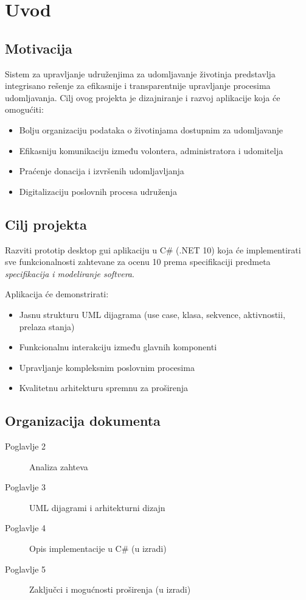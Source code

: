 \chapter{Uvod}

\section{Motivacija}

Sistem za upravljanje udruženjima za udomljavanje životinja predstavlja integrisano rešenje za efikasnije i transparentnije upravljanje procesima udomljavanja. Cilj ovog projekta je dizajniranje i razvoj aplikacije koja će omogućiti:

\begin{itemize}
    \item Bolju organizaciju podataka o životinjama dostupnim za udomljavanje
    \item Efikasniju komunikaciju između volontera, administratora i udomitelja
    \item Praćenje donacija i izvršenih udomljavljanja
    \item Digitalizaciju poslovnih procesa udruženja
\end{itemize}

\section{Cilj projekta}

Razviti prototip desktop gui aplikaciju u C\# (.NET 10) koja će implementirati sve funkcionalnosti zahtevane za ocenu 10 prema specifikaciji predmeta \textit{specifikacija i modeliranje softvera}.

Aplikacija će demonstrirati:
\begin{itemize}
    \item Jasnu strukturu UML dijagrama (use case, klasa, sekvence, aktivnostii, prelaza stanja)
    \item Funkcionalnu interakciju između glavnih komponenti
    \item Upravljanje kompleksnim poslovnim procesima
    \item Kvalitetnu arhitekturu spremnu za proširenja
\end{itemize}


\section{Organizacija dokumenta}

\begin{description}
    \item[Poglavlje 2] Analiza zahteva
    \item[Poglavlje 3] UML dijagrami i arhitekturni dizajn
    \item[Poglavlje 4] Opis implementacije u C\# (u izradi)
    \item[Poglavlje 5] Zaključci i mogućnosti proširenja (u izradi)
\end{description}
